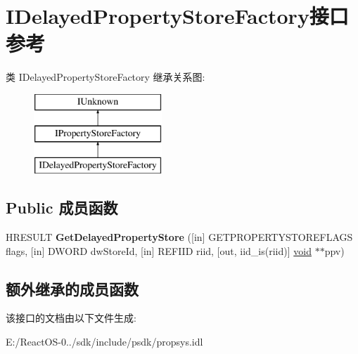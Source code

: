 \hypertarget{interface_i_delayed_property_store_factory}{}\section{I\+Delayed\+Property\+Store\+Factory接口 参考}
\label{interface_i_delayed_property_store_factory}
类 I\+Delayed\+Property\+Store\+Factory 继承关系图\+:\begin{figure}[H]
\begin{center}
\leavevmode
\includegraphics[height=3.000000cm]{interface_i_delayed_property_store_factory}
\end{center}
\end{figure}
\subsection*{Public 成员函数}
\begin{DoxyCompactItemize}
\item 
\mbox{\label{interface_i_delayed_property_store_factory_a4fa5a8dbde7adea2c225a8ee32570881}} 
H\+R\+E\+S\+U\+LT {\bfseries Get\+Delayed\+Property\+Store} (\mbox{[}in\mbox{]} G\+E\+T\+P\+R\+O\+P\+E\+R\+T\+Y\+S\+T\+O\+R\+E\+F\+L\+A\+GS flags, \mbox{[}in\mbox{]} D\+W\+O\+RD dw\+Store\+Id, \mbox{[}in\mbox{]} R\+E\+F\+I\+ID riid, \mbox{[}out, iid\+\_\+is(riid)\mbox{]} \hyperlink{interfacevoid}{void} $\ast$$\ast$ppv)
\end{DoxyCompactItemize}
\subsection*{额外继承的成员函数}


该接口的文档由以下文件生成\+:\begin{DoxyCompactItemize}
\item 
E\+:/\+React\+O\+S-\/0../sdk/include/psdk/propsys.\+idl\end{DoxyCompactItemize}
